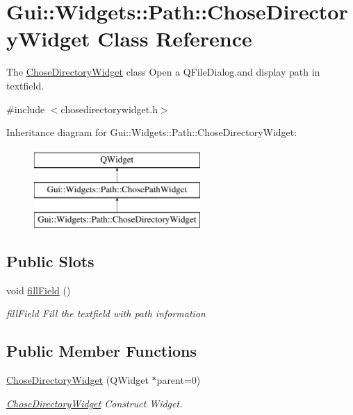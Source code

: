 \hypertarget{classGui_1_1Widgets_1_1Path_1_1ChoseDirectoryWidget}{}\section{Gui\+:\+:Widgets\+:\+:Path\+:\+:Chose\+Directory\+Widget Class Reference}
\label{classGui_1_1Widgets_1_1Path_1_1ChoseDirectoryWidget}


The \hyperlink{classGui_1_1Widgets_1_1Path_1_1ChoseDirectoryWidget}{Chose\+Directory\+Widget} class Open a Q\+File\+Dialog.\+and display path in textfield.  




{\ttfamily \#include $<$chosedirectorywidget.\+h$>$}

Inheritance diagram for Gui\+:\+:Widgets\+:\+:Path\+:\+:Chose\+Directory\+Widget\+:\begin{figure}[H]
\begin{center}
\leavevmode
\includegraphics[height=3.000000cm]{dd/d67/classGui_1_1Widgets_1_1Path_1_1ChoseDirectoryWidget}
\end{center}
\end{figure}
\subsection*{Public Slots}
\begin{DoxyCompactItemize}
\item 
\hypertarget{classGui_1_1Widgets_1_1Path_1_1ChoseDirectoryWidget_ab20017ce0bf79bb3961b1328ecab6d9e}{}void \hyperlink{classGui_1_1Widgets_1_1Path_1_1ChoseDirectoryWidget_ab20017ce0bf79bb3961b1328ecab6d9e}{fill\+Field} ()\label{classGui_1_1Widgets_1_1Path_1_1ChoseDirectoryWidget_ab20017ce0bf79bb3961b1328ecab6d9e}

\begin{DoxyCompactList}\small\item\em fill\+Field Fill the textfield with path information \end{DoxyCompactList}\end{DoxyCompactItemize}
\subsection*{Public Member Functions}
\begin{DoxyCompactItemize}
\item 
\hyperlink{classGui_1_1Widgets_1_1Path_1_1ChoseDirectoryWidget_aac9ce6a6c6c8322085f42528d99ac830}{Chose\+Directory\+Widget} (Q\+Widget $\ast$parent=0)
\begin{DoxyCompactList}\small\item\em \hyperlink{classGui_1_1Widgets_1_1Path_1_1ChoseDirectoryWidget}{Chose\+Directory\+Widget} Construct Widget. \end{DoxyCompactList}\end{DoxyCompactItemize}
